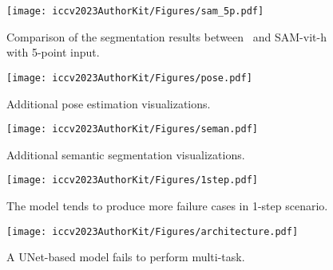 \clearpage
\begin{figure*}[htbp]
  \centering
  \texttt{[image: iccv2023AuthorKit/Figures/sam\_5p.pdf]}
  \caption{
   Comparison of the segmentation results between \ours\ and SAM-vit-h with 5-point input.
  }
  \label{fig:sam_5p}
\end{figure*}


\clearpage
\begin{figure*}[htbp]
  \centering
  \texttt{[image: iccv2023AuthorKit/Figures/pose.pdf]}
  \caption{
   Additional pose estimation visualizations.
  }
  \label{fig:pose}
\end{figure*}


\clearpage
\begin{figure*}[htbp]
  \centering
  \texttt{[image: iccv2023AuthorKit/Figures/seman.pdf]}
  \caption{
   Additional semantic segmentation visualizations.
  }
  \label{fig:seman}
\end{figure*}


\begin{figure*}[htb]
  \centering
  \texttt{[image: iccv2023AuthorKit/Figures/1step.pdf]}
  \caption{
   The model tends to produce more failure cases in 1-step scenario.
  }
  \label{fig:1step}
\end{figure*}

\begin{figure*}[htbp]
  \centering
  \texttt{[image: iccv2023AuthorKit/Figures/architecture.pdf]}
  \caption{
   A 
   UNet-based model fails to perform multi-task.
  }
  \label{fig:unet}
\end{figure*}
